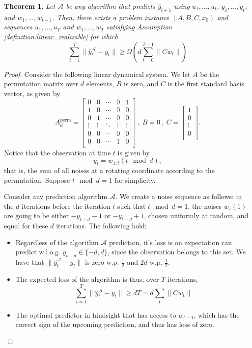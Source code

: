\documentclass[11pt]{article}
\def\mA{{\mathcal A}}
\def\mA{{\mathcal A}}
\newtheorem{theorem}{Theorem}[section]
\numberwithin{equation}{section}
\begin{document}
\begin{theorem}
\label{theorem:lowerbound}
Let $\mA$ be any algorithm that predicts $\hat{y}_{t+1}$ using $u_1, \ldots, u_t$, $y_1, \ldots, y_t$, and $w_1, \ldots, w_{t-1}$. Then, there exists a problem instance $(A, B, C, x_0)$ and sequences $u_1, \ldots, u_T$ and $w_1, \ldots, w_T$ satisfying Assumption \ref{definition:linear_realizable} for which
$$\sum_{t = 1}^T \|\hat{y}_t^\mA - y_t\| \geq \Omega\left( d  \sum_{t=0}^{T-1} \| C w_t\| \right) $$
\end{theorem}
\begin{proof}
Consider the following linear dynamical system. We let $A$ be the permutation matrix over $d$ elements, $B$ is zero, and $C$ is the first standard basis vector, as given by
$$ A_{d}^{\mathrm{perm}} = 
 \begin{bmatrix}
 0 & 0 & \cdots & 0 & 1 \\
 1 & 0 & \cdots & 0 & 0 \\
 0 & 1 & \cdots & 0 & 0 \\
 \vdots & \vdots & \ddots & \vdots & \vdots \\
 0 & 0 & \cdots & 0 & 0 \\
 0 & 0 & \cdots & 1 & 0 \\
 \end{bmatrix} \ , \ B = 0 \ , \ 
 C =  
 \begin{bmatrix}
 1 \\
 0 \\
 \vdots \\
 0 \\
 \end{bmatrix} . 
$$
Notice that the observation at time $t$ is given by
$$ y_t = w_{1:t}(t \mod d) , $$
that is, the sum of all noises at a rotating coordinate according to the permutation.  Suppose $t \mod d = 1$ for simplicity. 

Consider any prediction algorithm $\mA$. We create a noise sequence as follows: in the $d$ iterations before the iteration $t$ such that $t \mod d = 1$, the noises $w_\tau(1)$ are going to be either $-y_{t-d}-1$ or $-y_{t-d} + 1$, chosen uniformly at random, and equal for these $d$ iterations. The following hold:
\begin{itemize}
\item Regardless of the algorithm $\mA$ prediction, it's loss is on expectation can predict w.l.o.g. $y_{t-d} \in \{ -d,d \} $, since the observation belongs to this set.  We have that $ \|\hat{y}_t^\mA - y_t\|  $ is zero w.p. $\frac{1}{2}$ and $2d$ w.p. $\frac{1}{2}$.

\item The expected loss of the algorithm is thus, over $T$ iterations,
$$ \sum_{t=1}^T \|\hat{y}_t^\mA - y_t\| \geq {d}  T = {d} \sum_t \|C w_t\| $$

\item The optimal predictor in hindsight that has access to $w_{t-1}$, which has the correct sign of the upcoming prediction, and thus has loss of zero.   

\end{itemize}


\end{proof}
\end{document}

